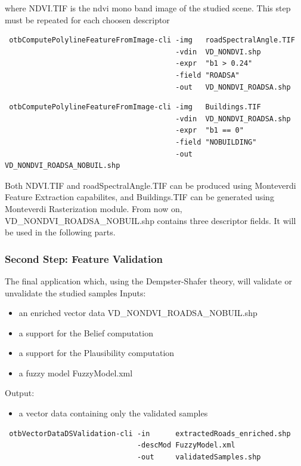 where NDVI.TIF is the ndvi mono band image of the studied scene.
This step must be repeated for each choosen descriptor

\begin{verbatim}
 otbComputePolylineFeatureFromImage-cli -img   roadSpectralAngle.TIF  
                                        -vdin  VD_NONDVI.shp 
                                        -expr  "b1 > 0.24"
                                        -field "ROADSA" 
                                        -out   VD_NONDVI_ROADSA.shp
\end{verbatim}

\begin{verbatim}
 otbComputePolylineFeatureFromImage-cli -img   Buildings.TIF 
                                        -vdin  VD_NONDVI_ROADSA.shp 
                                        -expr  "b1 == 0" 
                                        -field "NOBUILDING" 
                                        -out   VD_NONDVI_ROADSA_NOBUIL.shp
\end{verbatim}

Both NDVI.TIF and roadSpectralAngle.TIF can be produced using Monteverdi Feature Extraction capabilites, and Buildings.TIF can be generated using Monteverdi Rasterization module.
From now on, VD\_NONDVI\_ROADSA\_NOBUIL.shp contains three descriptor fields. It will be used in the following parts.

\subsubsection{Second Step: Feature Validation}

The final application which, using the Dempster-Shafer theory, will validate or unvalidate the studied samples
Inputs:
\begin{itemize}
\item an enriched vector data VD\_NONDVI\_ROADSA\_NOBUIL.shp
\item a support for the Belief computation
\item a support for the Plausibility computation
\item a fuzzy model FuzzyModel.xml
\end{itemize}
Output:
\begin{itemize}
\item a vector data containing only the validated samples
\end{itemize}
\begin{verbatim}
 otbVectorDataDSValidation-cli -in      extractedRoads_enriched.shp 
                               -descMod FuzzyModel.xml 
                               -out     validatedSamples.shp
\end{verbatim}

